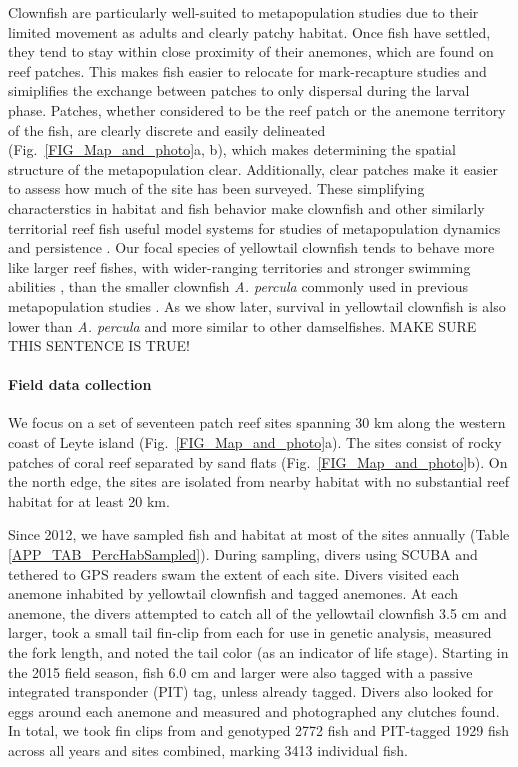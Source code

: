 \documentclass[12pt, oneside]{article}   	%
\begin{document}
Clownfish are particularly well-suited to metapopulation studies due to their limited movement as adults and clearly patchy habitat. Once fish have settled, they tend to stay within close proximity of their anemones, which are found on reef patches. This makes fish easier to relocate for mark-recapture studies and simiplifies the exchange between patches to only dispersal during the larval phase. Patches, whether considered to be the reef patch or the anemone territory of the fish, are clearly discrete and easily delineated (Fig.\ \ref{FIG_Map_and_photo}a, b), which makes determining the spatial structure of the metapopulation clear. Additionally, clear patches make it easier to assess how much of the site has been surveyed. These simplifying characterstics in habitat and fish behavior make clownfish and other similarly territorial reef fish useful model systems for studies of metapopulation dynamics and persistence \citep[e.g.][]{buston2013marine, salles_coral_2015, johnson2018integrating}. Our focal species of yellowtail clownfish tends to behave more like larger reef fishes, with wider-ranging territories and stronger swimming abilities \citep{hattori1991life, ochi1989mating}, than the smaller clownfish \textit{A. percula} commonly used in previous metapopulation studies \citep[e.g.][]{buston2011probability, salles_coral_2015}. As we show later, survival in yellowtail clownfish is also lower than \textit{A. percula} and more similar to other damselfishes. MAKE SURE THIS SENTENCE IS TRUE!

\paragraph*{Field data collection}

We focus on a set of seventeen patch reef sites spanning 30 km along the western coast of Leyte island (Fig.\ \ref{FIG_Map_and_photo}a). The sites consist of rocky patches of coral reef separated by sand flats (Fig.\ \ref{FIG_Map_and_photo}b). On the north edge, the sites are isolated from nearby habitat with no substantial reef habitat for at least 20 km. %

Since 2012, we have sampled fish and habitat at most of the sites annually (Table \ref{APP_TAB_PercHabSampled}). During sampling, divers using SCUBA and tethered to GPS readers swam the extent of each site. Divers visited each anemone inhabited by yellowtail clownfish and tagged anemones. At each anemone, the divers attempted to catch all of the yellowtail clownfish 3.5 cm and larger, took a small tail fin-clip from each for use in genetic analysis, measured the fork length, and noted the tail color (as an indicator of life stage). Starting in the 2015 field season, fish 6.0 cm and larger were also tagged with a passive integrated transponder (PIT) tag, unless already tagged. Divers also looked for eggs around each anemone and measured and photographed any clutches found. In total, we took fin clips from and genotyped 2772 fish and PIT-tagged 1929 fish across all years and sites combined, marking 3413 individual fish. %
\end{document}
